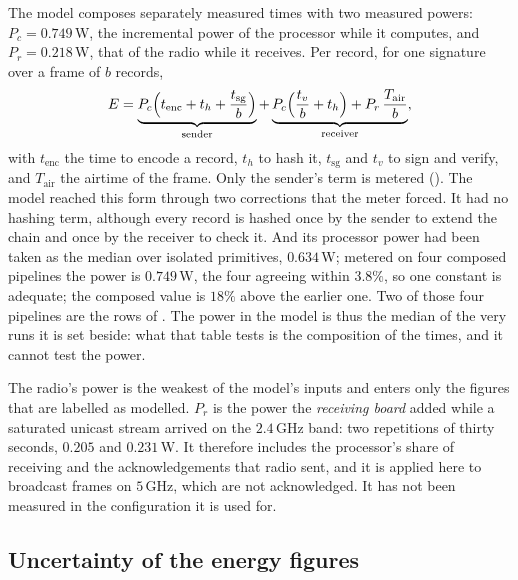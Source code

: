 The model composes separately measured times with two measured powers: $P_c = 0.749$\,W, the
incremental power of the processor while it computes, and $P_r = 0.218$\,W, that of the radio
while it receives. Per record, for one signature over a frame of $b$ records,
\[
E = \underbrace{P_c\Bigl(t_{\mathrm{enc}} + t_h + \frac{t_{\mathrm{sg}}}{b}\Bigr)}_{\text{sender}}
  + \underbrace{P_c\Bigl(\frac{t_v}{b} + t_h\Bigr) + P_r\,\frac{T_{\mathrm{air}}}{b}}_{\text{receiver}} ,
\]
with $t_{\mathrm{enc}}$ the time to encode a record, $t_h$ to hash it, $t_{\mathrm{sg}}$ and
$t_v$ to sign and verify, and $T_{\mathrm{air}}$ the airtime of the frame. Only the sender's
term is metered (). The model reached this form through two corrections that
the meter forced. It had no hashing term, although every record is hashed once by the sender to
extend the chain and once by the receiver to check it. And its processor power had been taken
as the median over isolated primitives, $0.634$\,W; metered on four composed pipelines the
power is $0.749$\,W, the four agreeing within $3.8\%$, so one constant is adequate; the
composed value is $18\%$ above the earlier one. Two of those four pipelines are the rows of
. The power in the model is thus the median of the very runs it is set beside:
what that table tests is the composition of the times, and it cannot test the power.

The radio's power is the weakest of the model's inputs and enters only the figures that are
labelled as modelled. $P_r$ is the power the \emph{receiving board} added while a saturated
unicast stream arrived on the $2.4$\,GHz band: two repetitions of thirty seconds, $0.205$ and
$0.231$\,W. It therefore includes the processor's share of receiving and the acknowledgements
that radio sent, and it is applied here to broadcast frames on $5$\,GHz, which are not
acknowledged. It has not been measured in the configuration it is used for.

\subsection{Uncertainty of the energy figures}\label{sec:energy-uncertainty}

